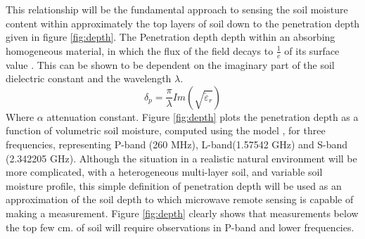 \documentclass[draftcls,onecolumn]{IEEEtran}  %
\begin{document}
This relationship will be the fundamental approach to sensing the soil moisture content within approximately the top layers of soil down to the penetration depth given in figure \ref{fig:depth}. The Penetration depth depth within an absorbing homogeneous material, in which the flux  of the field decays to $\frac{1}{e}$ of its surface value \cite{Ulaby:1981}.  This can be shown to be dependent on the imaginary part of the soil dielectric constant and the wavelength $\lambda$.
\begin{equation}
  \delta_p  = \frac{\pi}{\lambda} Im(\sqrt{\tilde{\varepsilon}_{r}})
\end{equation}
Where  $\alpha$ attenuation constant. Figure \ref{fig:depth} plots the penetration depth as a function of volumetric soil moisture, computed using the model \cite{Peplinski:1995}, for three frequencies, representing P-band (260 MHz), L-band(1.57542 GHz) and S-band (2.342205 GHz). Although the situation in a realistic  natural environment will be more complicated, with a heterogeneous multi-layer soil, and variable soil moisture profile, this simple definition of penetration depth will be used as an approximation of the soil depth to which microwave remote sensing is capable of making a measurement.  Figure \ref{fig:depth} clearly shows that measurements below the top few cm. of soil will require observations in P-band and lower frequencies. 
\end{document}
